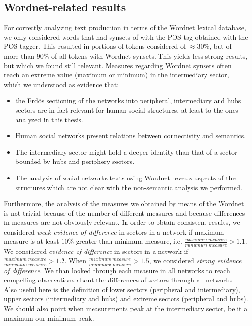 \subsection{Wordnet-related results}
For correctly analyzing text production in terms of the Wordnet lexical database,
we only considered words that had synsets of with the POS tag obtained with the POS tagger.
This resulted in portions of tokens considered of $\approx 30\%$,
but of more than $90\%$ of all tokens with Wordnet synsets.
This yields less strong results, but which we found still relevant.
Measures regarding Wordnet synsets often reach an extreme value (maximum or minimum)
in the intermediary sector, which we understood as evidence that:
\begin{itemize}
	\item the Erd\"os sectioning of the networks into peripheral, intermediary and hubs sectors are in fact relevant for human social structures, at least to the ones analyzed in this thesis.
	\item Human social networks present relations between connectivity and semantics.
	\item The intermediary sector might hold a deeper identity than that of a sector bounded by hubs and periphery sectors.
	\item The analysis of social networks texts using Wordnet reveals aspects of the structures which are not clear with the non-semantic analysis we performed.
\end{itemize}

Furthermore, the analysis of the measures we obtained by means of the Wordnet
is not trivial because of the number of different measures
and because differences in measures are not obviously relevant.
In order to obtain consistent results, we considered \emph{weak evidence of difference} in sectors in a network
if maximum measure is at least 10\% greater than minimum measure,
i.e. $\frac{maximum\;measure}{minumum\;measure}>1.1$.
We considered \emph{evidence of difference} in sectors in a network if
$\frac{maximum\;measure}{minumum\;measure}>1.2$.
When 
$\frac{maximum\;measure}{minumum\;measure}>1.5$, we considered \emph{strong evidence of difference}.
We than looked through each measure in all networks to reach compelling observations about the
differences of sectors through all networks.
Also useful here is the definition of lower sectors (peripheral and intermediary),
upper sectors (intermediary and hubs) and extreme sectors (peripheral and hubs).
We should also point when measurements peak at the intermediary sector,
be it a maximum our minimum peak.


